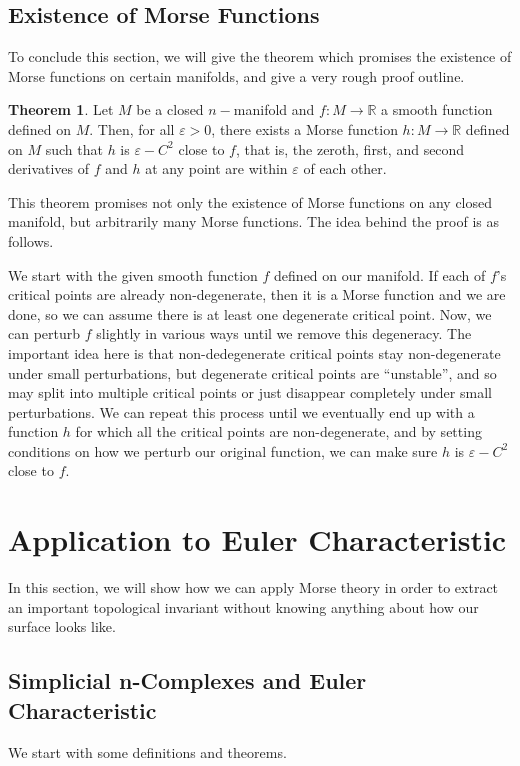 \documentclass[12pt]{article}
\newcommand{\bR}{{\mathbb R}}
\theoremstyle{definition}
\newtheorem{theorem}{Theorem}
\begin{document}
\subsection{Existence of Morse Functions}

	To conclude this section, we will give the theorem which promises the existence of Morse functions on certain manifolds, and give a very rough proof outline. 

	\begin{theorem}
		Let $M$ be a closed $n-$manifold and $f:M\rightarrow \bR$ a smooth function defined on $M$. Then, for all $\varepsilon >0$, there exists a Morse function $h:M\rightarrow \bR$ defined on $M$ such that $h$ is $\varepsilon-C^2$ close to $f$, that is, the zeroth, first, and second derivatives of $f$ and $h$ at any point are within $\varepsilon$ of each other. 
	\end{theorem}

	This theorem promises not only the existence of Morse functions on any closed manifold, but arbitrarily many Morse functions. The idea behind the proof is as follows. 

	We start with the given smooth function $f$ defined on our manifold. If each of $f$'s critical points are already non-degenerate, then it is a Morse function and we are done, so we can assume there is at least one degenerate critical point. Now, we can perturb $f$ slightly in various ways until we remove this degeneracy. The important idea here is that non-dedegenerate critical points stay non-degenerate under small perturbations, but degenerate critical points are ``unstable'', and so may split into multiple critical points or just disappear completely under small perturbations. We can repeat this process until we eventually end up with a function $h$ for which all the critical points are non-degenerate, and by setting conditions on how we perturb our original function, we can make sure $h$ is $\varepsilon-C^2$ close to $f$. 
\section{Application to Euler Characteristic}

In this section, we will show how we can apply Morse theory in order to extract an important topological invariant without knowing anything about how our surface looks like. 
\subsection{Simplicial n-Complexes and Euler Characteristic}
We start with some definitions and theorems. 
\end{document}
